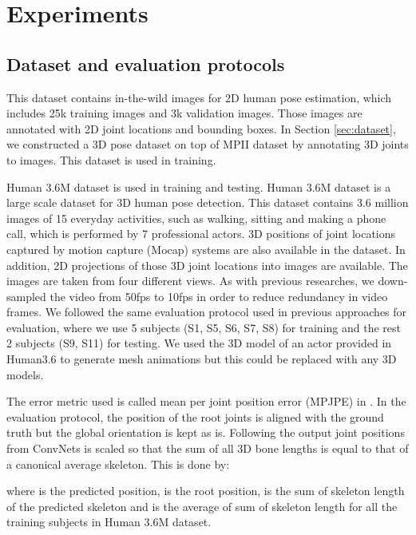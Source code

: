 \section{Experiments}

\subsection{Dataset and evaluation protocols}
This dataset contains in-the-wild images for 2D human pose estimation, which includes 25k training images and 3k validation images. Those images are annotated with 2D joint locations and bounding boxes. In Section \ref{sec:dataset}, we constructed a 3D pose dataset on top of MPII dataset by annotating 3D joints to images. This dataset is used in training.

Human 3.6M dataset \cite{ionescu2014human3} is used in training and testing. Human 3.6M dataset is a large scale dataset for 3D human pose detection. This dataset contains 3.6 million images of 15 everyday activities, such as walking, sitting and making a phone call, which is performed by 7 professional actors. 3D positions of joint locations captured by motion capture (Mocap) systems are also available in the dataset. In addition, 2D projections of those 3D joint locations into images are available. The images are taken from four different views. As with previous researches, we down-sampled the video from 50fps to 10fps in order to reduce redundancy in video frames. We followed the same evaluation protocol used in previous approaches \cite{PavlakosZDD16,zhou2017weakly} for evaluation, where we use 5 subjects (S1, S5, S6, S7, S8) for training and the rest 2 subjects (S9, S11) for testing.  We used the 3D model of an actor provided in Human3.6 to generate mesh animations but this could be replaced with any 3D models.

The error metric used is called mean per joint position error (MPJPE) in . In the evaluation protocol, the position of the root joints is aligned with the ground truth but the global orientation is kept as is. Following \cite{zhou2017weakly} the output joint positions from ConvNets is scaled so that the sum of all 3D bone lengths is equal to that of a canonical average skeleton. This is done by:

where  is the predicted position,  is the root position,  is the sum of skeleton length of the predicted skeleton and  is the average of sum of skeleton length for all the training subjects in Human 3.6M dataset. 

